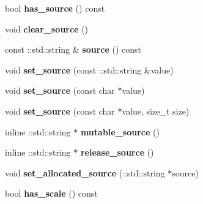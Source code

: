 \begin{DoxyCompactItemize}
bool {\bfseries has\+\_\+source} () const
\item 
\mbox{\label{classcaffe_1_1_window_data_parameter_ae7bf5aeb94e6720fe33b15a466b41ecb}} 
void {\bfseries clear\+\_\+source} ()
\item 
\mbox{\label{classcaffe_1_1_window_data_parameter_a8e2f71810a450705700807af4c330a3e}} 
const \+::std\+::string \& {\bfseries source} () const
\item 
\mbox{\label{classcaffe_1_1_window_data_parameter_ad2c0017ae802768bc4291b5619d56985}} 
void {\bfseries set\+\_\+source} (const \+::std\+::string \&value)
\item 
\mbox{\label{classcaffe_1_1_window_data_parameter_a5a2bd6b257b9c0d9a13c1cd8aab541a8}} 
void {\bfseries set\+\_\+source} (const char $\ast$value)
\item 
\mbox{\label{classcaffe_1_1_window_data_parameter_a936eeef351b0e0915e2fab9ce2126d1e}} 
void {\bfseries set\+\_\+source} (const char $\ast$value, size\+\_\+t size)
\item 
\mbox{\label{classcaffe_1_1_window_data_parameter_a6aaf4685761f61cbaf714a73deb430c1}} 
inline \+::std\+::string $\ast$ {\bfseries mutable\+\_\+source} ()
\item 
\mbox{\label{classcaffe_1_1_window_data_parameter_aa6eb4a8ba2c0b46d127ef99776646608}} 
inline \+::std\+::string $\ast$ {\bfseries release\+\_\+source} ()
\item 
\mbox{\label{classcaffe_1_1_window_data_parameter_ac7e10e4b3f38f1de19f9c699c47d77f1}} 
void {\bfseries set\+\_\+allocated\+\_\+source} (\+::std\+::string $\ast$source)
\item 
\mbox{\label{classcaffe_1_1_window_data_parameter_ab1e39594b765fb87a3960fc7a487ead7}} 
bool {\bfseries has\+\_\+scale} () const
\item 

\end{DoxyCompactItemize}

